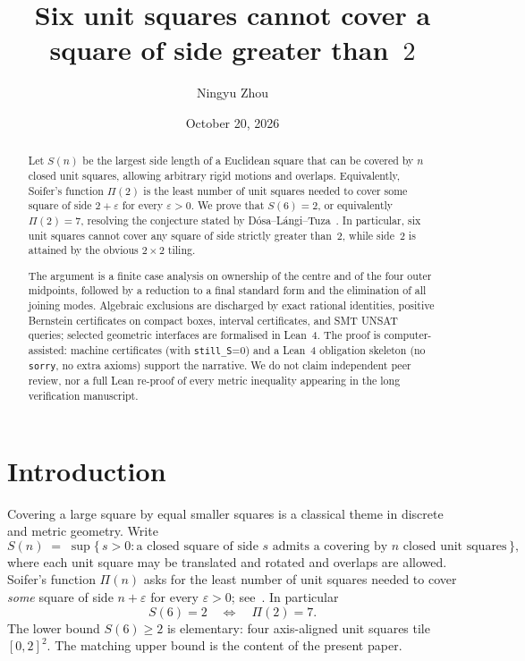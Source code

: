 \documentclass[11pt,reqno]{amsart}
\title[Six unit squares cannot cover a larger square]
{Six unit squares cannot cover a square of side greater than~$2$}
\author{Ningyu Zhou}
\date{October 20, 2026}
\theoremstyle{definition}
\begin{document}
\begin{abstract}
Let $S(n)$ be the largest side length of a Euclidean square that can be covered
by $n$ closed unit squares, allowing arbitrary rigid motions and overlaps.
Equivalently, Soifer's function $\Pi(2)$ is the least number of unit squares
needed to cover some square of side $2+\varepsilon$ for every $\varepsilon>0$.
We prove that $S(6)=2$, or equivalently $\Pi(2)=7$, resolving the conjecture
stated by D\'osa--L\'angi--Tuza~\cite{DLT2026}.
In particular, six unit squares cannot cover any square of side strictly greater
than~$2$, while side~$2$ is attained by the obvious $2\times 2$ tiling.

The argument is a finite case analysis on ownership of the centre and of the
four outer midpoints, followed by a reduction to a final standard form and the
elimination of all joining modes.  Algebraic exclusions are discharged by
exact rational identities, positive Bernstein certificates on compact boxes,
interval certificates, and SMT UNSAT queries; selected geometric interfaces
are formalised in Lean~4.  The proof is computer-assisted: machine certificates
(with \texttt{still\_S}=0) and a Lean~4 obligation skeleton (no \texttt{sorry},
no extra axioms) support the narrative.  We do not claim independent peer
review, nor a full Lean re-proof of every metric inequality appearing in the
long verification manuscript.
\end{abstract}


\maketitle

\tableofcontents

\section{Introduction}\label{sec:intro}

Covering a large square by equal smaller squares is a classical theme in
discrete and metric geometry.  Write
\begin{equation}\label{eq:Sn}
S(n)
\;=\;
\sup\bigl\{\,s>0 :
\text{a closed square of side~$s$ admits a covering by~$n$ closed unit squares}
\,\bigr\},
\end{equation}
where each unit square may be translated and rotated and overlaps are allowed.
Soifer's function $\Pi(n)$ asks for the least number of unit squares needed to
cover \emph{some} square of side $n+\varepsilon$ for every $\varepsilon>0$;
see~\cite{Soifer2006,SoiferCoverUp}.  In particular
\begin{equation}\label{eq:equiv}
S(6)=2
\quad\Longleftrightarrow\quad
\Pi(2)=7.
\end{equation}
The lower bound $S(6)\ge 2$ is elementary: four axis-aligned unit squares tile
$[0,2]^2$.  The matching upper bound is the content of the present paper.
\end{document}
